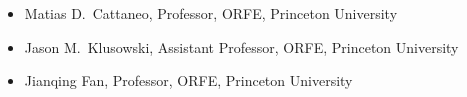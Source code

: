 \documentclass{wgu-cv}
\begin{document}
\vspace*{3mm}


\vspace*{-3mm}

\begin{itemize}

  \item
    Matias D.\ Cattaneo,
    Professor,
    ORFE,
    Princeton University

  \item
    Jason M.\ Klusowski,
    Assistant Professor,
    ORFE,
    Princeton University

  \item
    Jianqing Fan,
    Professor,
    ORFE,
    Princeton University

\end{itemize}
\end{document}
